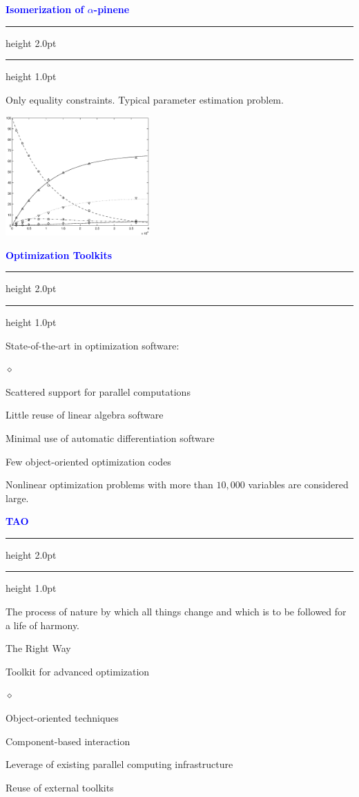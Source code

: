 \documentclass{seminar}
\newcommand{\reddiamond}{\textcolor{BrickRed}{$\diamond$}}
\newcommand{\redstripe}{\textcolor{BrickRed}{\hrule height 2.0pt\hfil}
             \vspace{-1.8pt}
             \textcolor{BrickRed}{\hrule height 1.0pt\hfil}
}
\newcommand{\heading}[1]{%
   \vspace*{0.5pt}%
   \centerline{\textcolor{Blue}{\textbf{#1}}}%
   \redstripe
}
\begin{document}
\begin{slide}

\heading{Isomerization of $\alpha$-pinene}

Only equality constraints. Typical parameter estimation problem. 

\bigskip

\centerline {\includegraphics[height=1.8in]{../images/pinene.eps}}

\end{slide}

\begin{slide}

\heading{Optimization Toolkits}

State-of-the-art in optimization software:

\begin{list}{\reddiamond}{}
\item
Scattered support for parallel computations
\item
Little reuse of linear algebra software
\item
Minimal use of automatic differentiation software
\item
Few object-oriented optimization codes
\item
Nonlinear optimization problems with more than $ 10, 000 $
variables are considered large.
\end{list}

\vfill

\end{slide}

\begin{slide}

\heading{TAO}

The process of nature by which all things change
and which is to be followed for a life of harmony.

\bigskip

\begin{center}
\textcolor{BrickRed}{The Right Way}
\end{center}

\bigskip

Toolkit for advanced optimization

\begin{list}{\reddiamond}{}
\item
Object-oriented techniques
\item
Component-based interaction
\item
Leverage of existing parallel computing infrastructure
\item
Reuse of external toolkits
\end{list}

\vfill

\end{slide}
\end{document}
